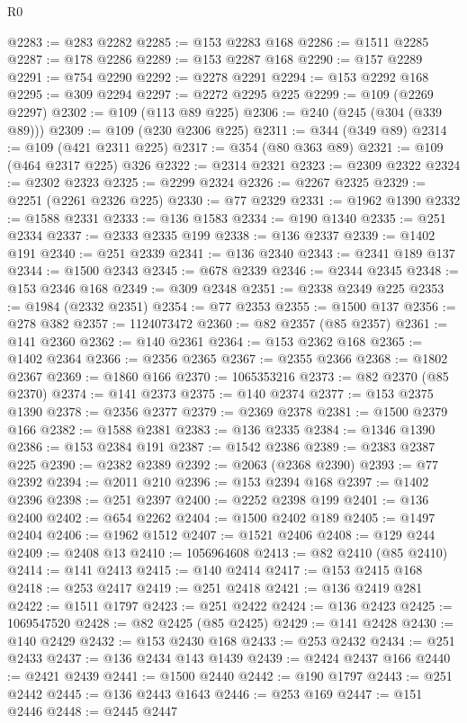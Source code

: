 \begin{lexlean}{R0}
\begin{coremodule}
@2283 := @283 @2282
@2285 := @153 @2283 @168
@2286 := @1511 @2285
@2287 := @178 @2286
@2289 := @153 @2287 @168
@2290 := @157 @2289
@2291 := @754 @2290
@2292 := @2278 @2291
@2294 := @153 @2292 @168
@2295 := @309 @2294
@2297 := @2272 @2295 @225
@2299 := @109 (@2269 @2297)
@2302 := @109 (@113 @89 @225)
@2306 := @240 (@245 (@304 (@339 @89)))
@2309 := @109 (@230 @2306 @225)
@2311 := @344 (@349 @89)
@2314 := @109 (@421 @2311 @225)
@2317 := @354 (@80 @363 @89)
@2321 := @109 (@464 @2317 @225) @326
@2322 := @2314 @2321
@2323 := @2309 @2322
@2324 := @2302 @2323
@2325 := @2299 @2324
@2326 := @2267 @2325
@2329 := @2251 (@2261 @2326 @225)
@2330 := @77 @2329
@2331 := @1962 @1390
@2332 := @1588 @2331
@2333 := @136 @1583
@2334 := @190 @1340
@2335 := @251 @2334
@2337 := @2333 @2335 @199
@2338 := @136 @2337
@2339 := @1402 @191
@2340 := @251 @2339
@2341 := @136 @2340
@2343 := @2341 @189 @137
@2344 := @1500 @2343
@2345 := @678 @2339
@2346 := @2344 @2345
@2348 := @153 @2346 @168
@2349 := @309 @2348
@2351 := @2338 @2349 @225
@2353 := @1984 (@2332 @2351)
@2354 := @77 @2353
@2355 := @1500 @137
@2356 := @278 @382
@2357 := 1124073472
@2360 := @82 @2357 (@85 @2357)
@2361 := @141 @2360
@2362 := @140 @2361
@2364 := @153 @2362 @168
@2365 := @1402 @2364
@2366 := @2356 @2365
@2367 := @2355 @2366
@2368 := @1802 @2367
@2369 := @1860 @166
@2370 := 1065353216
@2373 := @82 @2370 (@85 @2370)
@2374 := @141 @2373
@2375 := @140 @2374
@2377 := @153 @2375 @1390
@2378 := @2356 @2377
@2379 := @2369 @2378
@2381 := @1500 @2379 @166
@2382 := @1588 @2381
@2383 := @136 @2335
@2384 := @1346 @1390
@2386 := @153 @2384 @191
@2387 := @1542 @2386
@2389 := @2383 @2387 @225
@2390 := @2382 @2389
@2392 := @2063 (@2368 @2390)
@2393 := @77 @2392
@2394 := @2011 @210
@2396 := @153 @2394 @168
@2397 := @1402 @2396
@2398 := @251 @2397
@2400 := @2252 @2398 @199
@2401 := @136 @2400
@2402 := @654 @2262
@2404 := @1500 @2402 @189
@2405 := @1497 @2404
@2406 := @1962 @1512
@2407 := @1521 @2406
@2408 := @129 @244
@2409 := @2408 @13
@2410 := 1056964608
@2413 := @82 @2410 (@85 @2410)
@2414 := @141 @2413
@2415 := @140 @2414
@2417 := @153 @2415 @168
@2418 := @253 @2417
@2419 := @251 @2418
@2421 := @136 @2419 @281
@2422 := @1511 @1797
@2423 := @251 @2422
@2424 := @136 @2423
@2425 := 1069547520
@2428 := @82 @2425 (@85 @2425)
@2429 := @141 @2428
@2430 := @140 @2429
@2432 := @153 @2430 @168
@2433 := @253 @2432
@2434 := @251 @2433
@2437 := @136 @2434 @143 @1439
@2439 := @2424 @2437 @166
@2440 := @2421 @2439
@2441 := @1500 @2440
@2442 := @190 @1797
@2443 := @251 @2442
@2445 := @136 @2443 @1643
@2446 := @253 @169
@2447 := @151 @2446
@2448 := @2445 @2447

\end{coremodule}
\end{lexlean}
